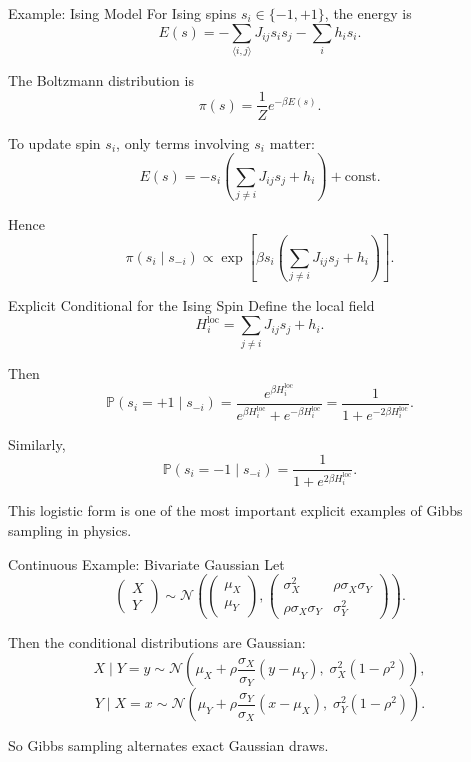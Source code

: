 \documentclass[aspectratio=169]{beamer}
\begin{document}
\begin{frame}{Example: Ising Model}
For Ising spins \(s_i\in\{-1,+1\}\), the energy is
\[
E(s)=-\sum_{\langle i,j\rangle} J_{ij}s_i s_j - \sum_i h_i s_i.
\]

The Boltzmann distribution is
\[
\pi(s)=\frac{1}{Z}e^{-\beta E(s)}.
\]

To update spin \(s_i\), only terms involving \(s_i\) matter:
\[
E(s)= - s_i \left(\sum_{j\neq i} J_{ij}s_j + h_i\right) + \text{const}.
\]

Hence
\[
\pi(s_i\mid s_{-i})
\propto
\exp\left[
\beta s_i \left(\sum_{j\neq i} J_{ij}s_j + h_i\right)
\right].
\]
\end{frame}

\begin{frame}{Explicit Conditional for the Ising Spin}
Define the local field
\[
H_i^{\mathrm{loc}}=\sum_{j\neq i} J_{ij}s_j + h_i.
\]

Then
\[
\mathbb{P}(s_i=+1\mid s_{-i})
=
\frac{e^{\beta H_i^{\mathrm{loc}}}}
{e^{\beta H_i^{\mathrm{loc}}}+e^{-\beta H_i^{\mathrm{loc}}}}
=
\frac{1}{1+e^{-2\beta H_i^{\mathrm{loc}}}}.
\]

Similarly,
\[
\mathbb{P}(s_i=-1\mid s_{-i})
=
\frac{1}{1+e^{2\beta H_i^{\mathrm{loc}}}}.
\]

This logistic form is one of the most important explicit examples of Gibbs sampling in physics.
\end{frame}

\begin{frame}{Continuous Example: Bivariate Gaussian}
Let
\[
\begin{pmatrix}
X\\Y
\end{pmatrix}
\sim \mathcal{N}
\left(
\begin{pmatrix}
\mu_X\\\mu_Y
\end{pmatrix},
\begin{pmatrix}
\sigma_X^2 & \rho \sigma_X \sigma_Y \\
\rho \sigma_X \sigma_Y & \sigma_Y^2
\end{pmatrix}
\right).
\]

Then the conditional distributions are Gaussian:
\[
X\mid Y=y \sim \mathcal{N}\left(\mu_X+\rho\frac{\sigma_X}{\sigma_Y}(y-\mu_Y),\;\sigma_X^2(1-\rho^2)\right),
\]
\[
Y\mid X=x \sim \mathcal{N}\left(\mu_Y+\rho\frac{\sigma_Y}{\sigma_X}(x-\mu_X),\;\sigma_Y^2(1-\rho^2)\right).
\]

So Gibbs sampling alternates exact Gaussian draws.
\end{frame}
\end{document}

